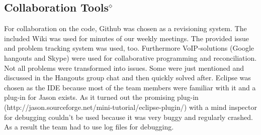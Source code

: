 \subsection{Collaboration Tools$^\diamond$}
For collaboration on the code, Github was chosen as a revisioning system. The included Wiki was used for minutes of our weekly meetings. The provided issue and problem tracking system was used, too. Furthermore VoIP-solutions (Google hangouts and Skype) were used for collaborative programming and reconciliation. Not all problems were transformed into issues. Some were just mentioned and discussed in the Hangouts group chat and then quickly solved after. Eclipse was chosen as the IDE because most of the team members were familiar with it and a plug-in for Jason exists. As it turned out the promising plug-in (http://jason.sourceforge.net/mini-tutorial/eclipse-plugin/) with a mind inspector for debugging couldn't be used because it was very buggy and regularly crashed. As a result the team had to use log files for debugging. 

